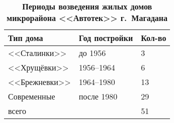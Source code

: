 
\begin{wraptable}{r}{7.0cm}
  \caption*{\textbf{Периоды возведения жилых домов микрорайона <<Автотек>> г.~Магадана} }
  \label{tab:sydchak-tab}
  \begin{tabular}{lll}
\toprule
  Тип дома    & Год постройки & Кол-во \\
\midrule
  <<Сталинки>>    & до 1956       & 3      \\
  <<Хрущёвки>>    & 1956--1964     & 6      \\
  <<Брежневки>>   & 1964--1980     & 13     \\
  Современные & после 1980    & 29     \\\midrule
  всего       &               & 51\\ \bottomrule
  \end{tabular}


\end{wraptable}
